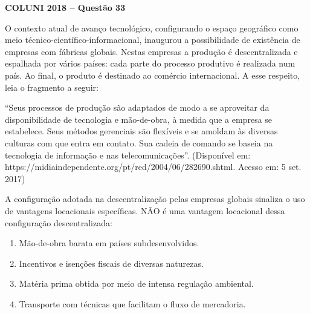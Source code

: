 \textbf{COLUNI 2018 -- Questão 33}\par\medskip O contexto atual de avanço tecnológico, configurando o espaço geográfico como meio técnico-científico-informacional, inaugurou a possibilidade de existência de empresas com fábricas globais. Nestas empresas a produção é descentralizada e espalhada por vários países: cada parte do processo produtivo é realizada num país. Ao final, o produto é destinado ao comércio internacional. A esse respeito, leia o fragmento a seguir:

\par

“Seus processos de produção são adaptados de modo a se aproveitar da disponibilidade de tecnologia e mão-de-obra, à medida que a empresa se estabelece. Seus métodos gerenciais são flexíveis e se amoldam às diversas culturas com que entra em contato. Sua cadeia de comando se baseia na tecnologia de informação e nas telecomunicações”. (Disponível em: https://midiaindependente.org/pt/red/2004/06/282690.shtml. Acesso em: 5 set. 2017)

\par

A configuração adotada na descentralização pelas empresas globais sinaliza o uso de vantagens locacionais específicas. NÃO é uma vantagem locacional dessa configuração descentralizada:\begin{enumerate}
\item Mão-de-obra barata em países subdesenvolvidos.
\item Incentivos e isenções fiscais de diversas naturezas.
\item Matéria prima obtida por meio de intensa regulação ambiental.
\item Transporte com técnicas que facilitam o fluxo de mercadoria.\end{enumerate}
